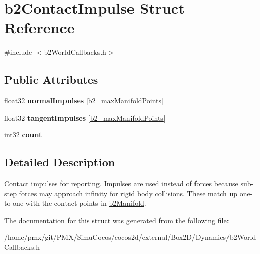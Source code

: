 \hypertarget{structb2ContactImpulse}{}\section{b2\+Contact\+Impulse Struct Reference}
\label{structb2ContactImpulse}


{\ttfamily \#include $<$b2\+World\+Callbacks.\+h$>$}

\subsection*{Public Attributes}
\begin{DoxyCompactItemize}
\item 
\mbox{\label{structb2ContactImpulse_a2a7e14d392967a58106c38c8c3c2c3bf}} 
float32 {\bfseries normal\+Impulses} \mbox{[}\hyperlink{_2cocos2d_2external_2Box2D_2include_2Box2D_2Common_2b2Settings_8h_aa5f44cc9edf711433dea2b2ec94f3c42}{b2\+\_\+max\+Manifold\+Points}\mbox{]}
\item 
\mbox{\label{structb2ContactImpulse_a6e118bb3f5da2b15db2935ad909335b0}} 
float32 {\bfseries tangent\+Impulses} \mbox{[}\hyperlink{_2cocos2d_2external_2Box2D_2include_2Box2D_2Common_2b2Settings_8h_aa5f44cc9edf711433dea2b2ec94f3c42}{b2\+\_\+max\+Manifold\+Points}\mbox{]}
\item 
\mbox{\label{structb2ContactImpulse_a258e094ab0d769971f40d6c144420bf7}} 
int32 {\bfseries count}
\end{DoxyCompactItemize}


\subsection{Detailed Description}
Contact impulses for reporting. Impulses are used instead of forces because sub-\/step forces may approach infinity for rigid body collisions. These match up one-\/to-\/one with the contact points in \hyperlink{structb2Manifold}{b2\+Manifold}. 

The documentation for this struct was generated from the following file\+:\begin{DoxyCompactItemize}
\item 
/home/pmx/git/\+P\+M\+X/\+Simu\+Cocos/cocos2d/external/\+Box2\+D/\+Dynamics/b2\+World\+Callbacks.\+h\end{DoxyCompactItemize}
